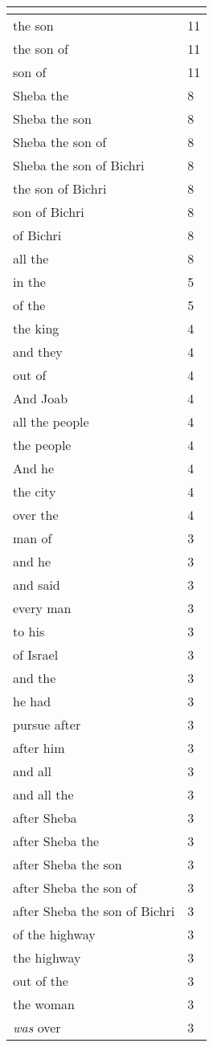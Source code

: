 \begin{center}
\begin{longtable}{|p{3.0in}|p{0.5in}|}
\hline \multicolumn{2}{c}{{ }} \\ \hline
\endfoot 
the son & 11\\ \hline 
the son of & 11\\ \hline 
son of & 11\\ \hline 
Sheba the & 8\\ \hline 
Sheba the son & 8\\ \hline 
Sheba the son of & 8\\ \hline 
Sheba the son of Bichri & 8\\ \hline 
the son of Bichri & 8\\ \hline 
son of Bichri & 8\\ \hline 
of Bichri & 8\\ \hline 
all the & 8\\ \hline 
in the & 5\\ \hline 
of the & 5\\ \hline 
the king & 4\\ \hline 
and they & 4\\ \hline 
out of & 4\\ \hline 
And Joab & 4\\ \hline 
all the people & 4\\ \hline 
the people & 4\\ \hline 
And he & 4\\ \hline 
the city & 4\\ \hline 
over the & 4\\ \hline 
man of & 3\\ \hline 
and he & 3\\ \hline 
and said & 3\\ \hline 
every man & 3\\ \hline 
to his & 3\\ \hline 
of Israel & 3\\ \hline 
and the & 3\\ \hline 
he had & 3\\ \hline 
pursue after & 3\\ \hline 
after him & 3\\ \hline 
and all & 3\\ \hline 
and all the & 3\\ \hline 
after Sheba & 3\\ \hline 
after Sheba the & 3\\ \hline 
after Sheba the son & 3\\ \hline 
after Sheba the son of & 3\\ \hline 
after Sheba the son of Bichri & 3\\ \hline 
of the highway & 3\\ \hline 
the highway & 3\\ \hline 
out of the & 3\\ \hline 
the woman & 3\\ \hline 
\emph{was} over & 3\\ \hline 
\end{longtable}
\end{center}





